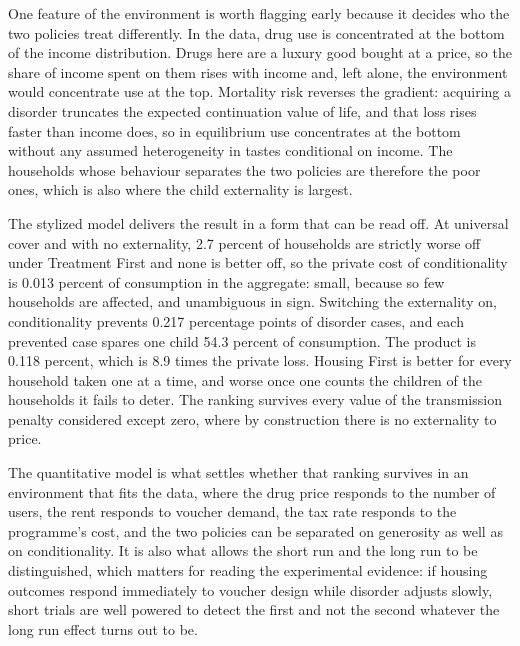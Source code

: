 \documentclass[10pt]{article}
\begin{document}
One feature of the environment is worth flagging early because it decides who the
two policies treat differently. In the data, drug use is concentrated at the bottom
of the income distribution. Drugs here are a luxury good bought at a price, so the
share of income spent on them rises with income and, left alone, the environment
would concentrate use at the top. Mortality risk reverses the gradient: acquiring a
disorder truncates the expected continuation value of life, and that loss rises
faster than income does, so in equilibrium use concentrates at the bottom without
any assumed heterogeneity in tastes conditional on income. The households whose
behaviour separates the two policies are therefore the poor ones, which is also
where the child externality is largest.



The stylized model delivers the result in a form that can be read off. At universal
cover and with no externality, 2.7 percent of households are strictly worse
off under Treatment First and none is better off, so the private cost of
conditionality is 0.013 percent of consumption in the aggregate: small, because
so few households are affected, and unambiguous in sign. Switching the externality
on, conditionality prevents 0.217 percentage points of disorder cases, and each
prevented case spares one child 54.3 percent of consumption. The product is
0.118 percent, which is 8.9 times the private loss. Housing First is
better for every household taken one at a time, and worse once one counts the
children of the households it fails to deter. The ranking survives every value of
the transmission penalty considered except zero, where by construction there is no
externality to price.



The quantitative model is what settles whether that ranking survives in an
environment that fits the data, where the drug price responds to the number of
users, the rent responds to voucher demand, the tax rate responds to the programme's
cost, and the two policies can be separated on generosity as well as on
conditionality. It is also what allows the short run and the long run to be
distinguished, which matters for reading the experimental evidence: if housing
outcomes respond immediately to voucher design while disorder adjusts slowly,
short trials are well powered to detect the first and not the second whatever the
long run effect turns out to be.



\end{document}
